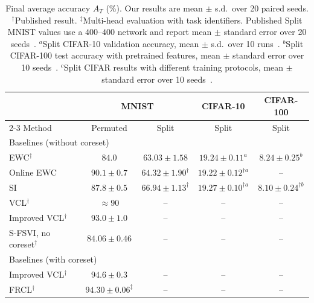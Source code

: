 \begin{table}[t]
  \centering
  \caption{Final average accuracy $A_T$ (\%). Our results are mean $\pm$
  s.d.\ over 20 paired seeds. $^\dagger$Published result.
  $^\ddagger$Multi-head evaluation with task identifiers. Published Split
  MNIST values use a $400$--$400$ network and report mean $\pm$ standard
  error over 20 seeds~\cite{vandeven2019three,vandeven2022types}.
  $^a$Split CIFAR-10 validation accuracy, mean $\pm$ s.d.\ over 10
  runs~\cite{mazur2021target}. $^b$Split CIFAR-100 test accuracy with
  pretrained features, mean $\pm$ standard error over 10
  seeds~\cite{vandeven2022types}. $^c$Split CIFAR results with different
  training protocols, mean $\pm$ standard error over 10
  seeds~\cite{kessler2023sequential}.}
  \label{tab:main_results}
  \footnotesize
  \setlength{\tabcolsep}{4pt}
  \begin{tabular*}{\textwidth}{@{\extracolsep{\fill}}lcccc@{}}
  \hline
  & \multicolumn{2}{c}{MNIST} & CIFAR-10 & CIFAR-100 \\
  \cline{2-3}
  Method & Permuted & Split & Split & Split \\
  \hline
  \multicolumn{5}{l}{Baselines (without coreset)} \\
  EWC$^\dagger$~\cite{kirkpatrick2017ewc,nguyen2018vcl,vandeven2022types,mazur2021target}
      & $84.0$ & $63.03\pm1.58$ & $19.24\pm0.11^{a}$ & $8.24\pm0.25^{b}$ \\
  Online EWC~\cite{schwarz2018progress,vandeven2019three,mazur2021target}
      & $90.1\pm0.7$ & $64.32\pm1.90^{\dagger}$ & $19.22\pm0.12^{\dagger a}$ & -- \\
  SI~\cite{zenke2017si,vandeven2022types,mazur2021target}
      & $87.8\pm0.5$ & $66.94\pm1.13^{\dagger}$
      & $19.27\pm0.10^{\dagger a}$ & $8.10\pm0.24^{\dagger b}$ \\
  VCL$^\dagger$~\cite{nguyen2018vcl}
      & $\approx90$ & -- & -- & -- \\
  Improved VCL$^\dagger$~\cite{swaroop2019improving}
      & $93.0\pm1.0$ & -- & -- & -- \\
  S-FSVI, no coreset$^\dagger$~\cite{rudner2022sfsvi}
      & $84.06\pm0.46$ & -- & -- & -- \\
  \hline
  \multicolumn{5}{l}{Baselines (with coreset)} \\
  Improved VCL$^\dagger$~\cite{swaroop2019improving}
      & $94.6\pm0.3$ & -- & -- & -- \\
  FRCL$^\dagger$~\cite{titsias2020frcl,rudner2022sfsvi}
      & $94.30\pm0.06^{\ddagger}$ & -- & -- & -- \\

\end{tabular*}
\end{table}
